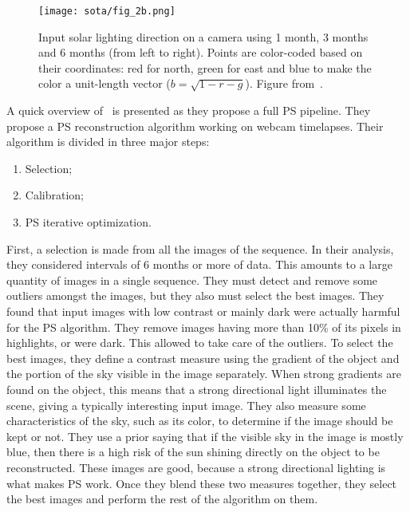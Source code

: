 \begin{figure}
\centering
\texttt{[image: sota/fig\_2b.png]}
\caption{Input solar lighting direction on a camera using 1 month, 3 months and 6 months (from left to right). Points are color-coded based on their coordinates: red for north, green for east and blue to make the color a unit-length vector ($b = \sqrt{1 - r - g}$). Figure from~\cite{abrams-eccv-12}.}
\label{fig:abrams-sunpath}
\end{figure}

A quick overview of~\cite{ackermann-cvpr-12} is presented as they propose a full PS pipeline. They propose a PS reconstruction algorithm working on webcam timelapses. Their algorithm is divided in three major steps:
\begin{enumerate}
  \item Selection;
  \item Calibration;
  \item PS iterative optimization.
\end{enumerate}%
First, a selection is made from all the images of the sequence. In their analysis, they considered intervals of 6 months or more of data. This amounts to a large quantity of images in a single sequence. They must detect and remove some outliers amongst the images, but they also must select the best images. They found that input images with low contrast or mainly dark were actually harmful for the PS algorithm. They remove images having more than 10\% of its pixels in highlights, or were dark. This allowed to take care of the outliers. To select the best images, they define a contrast measure using the gradient of the object and the portion of the sky visible in the image separately. When strong gradients are found on the object, this means that a strong directional light illuminates the scene, giving a typically interesting input image. They also measure some characteristics of the sky, such as its color, to determine if the image should be kept or not. They use a prior saying that if the visible sky in the image is mostly blue, then there is a high risk of the sun shining directly on the object to be reconstructed. These images are good, because a strong directional lighting is what makes PS work. Once they blend these two measures together, they select the best images and perform the rest of the algorithm on them.

